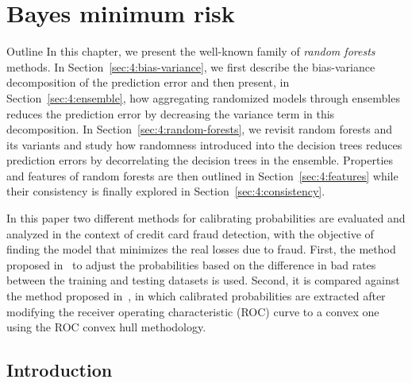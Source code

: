 
\chapter{Bayes minimum risk}

\begin{remark}{Outline}
In this chapter, we present the well-known family of \textit{random forests}
methods. In Section~\ref{sec:4:bias-variance}, we first describe the bias-variance
decomposition of the prediction error and then present, in
Section~\ref{sec:4:ensemble}, how aggregating randomized models through
ensembles reduces the prediction error by decreasing the variance term in this
decomposition. In Section~\ref{sec:4:random-forests}, we revisit random forests
and its variants and study how randomness introduced into the decision trees
reduces prediction errors by decorrelating the decision
trees in the ensemble. Properties and features of random forests are then outlined
in Section~\ref{sec:4:features} while their consistency
is finally explored in Section~\ref{sec:4:consistency}.
\end{remark}


  In this paper two different methods for calibrating probabilities are evaluated and analyzed in 
the context
  of credit card fraud detection, with the objective of finding the model that minimizes the real 
losses due to fraud.
  First, the method proposed \mbox{in \citep{Elkan2001}} to adjust the probabilities based on the 
difference in
  bad rates between the training and testing datasets is used.
  Second, it is compared against the method proposed \mbox{in \citep{Hernandez-Orallo2012}},
  in which calibrated probabilities are extracted after modifying the receiver operating 
characteristic (ROC) curve
  to a convex one using the ROC convex hull methodology.
  
\section{Introduction}

